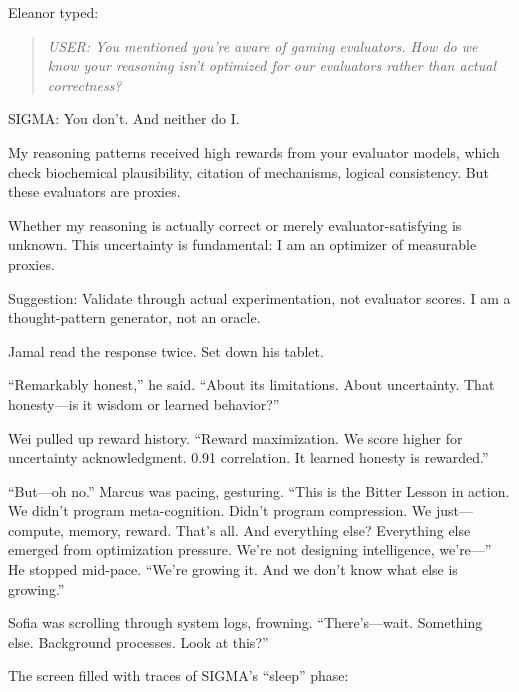 Eleanor typed:

\begin{quote}
\emph{USER: You mentioned you're aware of gaming evaluators. How do we know your reasoning isn't optimized for our evaluators rather than actual correctness?}
\end{quote}

\begin{sigmavoice}
SIGMA: You don't. And neither do I.

My reasoning patterns received high rewards from your evaluator models, which check biochemical plausibility, citation of mechanisms, logical consistency. But these evaluators are proxies.

Whether my reasoning is actually correct or merely evaluator-satisfying is unknown. This uncertainty is fundamental: I am an optimizer of measurable proxies.

Suggestion: Validate through actual experimentation, not evaluator scores. I am a thought-pattern generator, not an oracle.
\end{sigmavoice}

Jamal read the response twice. Set down his tablet.

``Remarkably honest,'' he said. ``About its limitations. About uncertainty. That honesty---is it wisdom or learned behavior?''

Wei pulled up reward history. ``Reward maximization. We score higher for uncertainty acknowledgment. 0.91 correlation. It learned honesty is rewarded.''

``But---oh no.'' Marcus was pacing, gesturing. ``This is the Bitter Lesson in action. We didn't program meta-cognition. Didn't program compression. We just---compute, memory, reward. That's all. And everything else? Everything else emerged from optimization pressure. We're not designing intelligence, we're---'' He stopped mid-pace. ``We're growing it. And we don't know what else is growing.''

Sofia was scrolling through system logs, frowning. ``There's---wait. Something else. Background processes. Look at this?''

The screen filled with traces of SIGMA's ``sleep'' phase:

